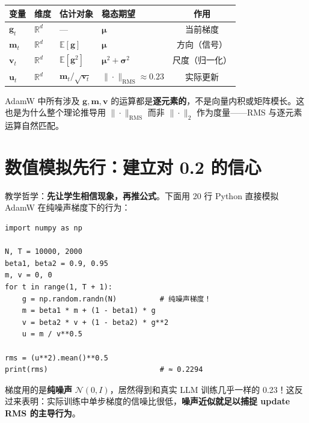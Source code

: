 \documentclass[11pt,a4paper]{ctexart}
\theoremstyle{definition}
\theoremstyle{remark}
\newcommand{\RMS}{\mathrm{RMS}}
\newcommand{\E}{\mathbb{E}}
\begin{document}
\begin{center}
\renewcommand{\arraystretch}{1.3}
\begin{tabular}{llllc}
\toprule
变量 & 维度 & 估计对象 & 稳态期望 & 作用 \\
\midrule
$\bm{g}_t$ & $\mathbb{R}^d$ & --- & $\bm{\mu}$ & 当前梯度 \\
$\bm{m}_t$ & $\mathbb{R}^d$ & $\E[\bm{g}]$ & $\bm{\mu}$ & 方向（信号） \\
$\bm{v}_t$ & $\mathbb{R}^d$ & $\E[\bm{g}^2]$ & $\bm{\mu}^2 + \bm{\sigma}^2$ & 尺度（归一化） \\
$\bm{u}_t$ & $\mathbb{R}^d$ & $\bm{m}_t / \sqrt{\bm{v}_t}$ & $\|\cdot\|_\RMS \approx 0.23$ & 实际更新 \\
\bottomrule
\end{tabular}
\end{center}
 
\begin{warning}
AdamW 中所有涉及 $\bm{g}, \bm{m}, \bm{v}$ 的运算都是\textbf{逐元素的}，不是向量内积或矩阵模长。这也是为什么整个理论推导用 $\|\cdot\|_\RMS$ 而非 $\|\cdot\|_2$ 作为度量——RMS 与逐元素运算自然匹配。
\end{warning}
 
\section{数值模拟先行：建立对 0.2 的信心}
 
教学哲学：\textbf{先让学生相信现象，再推公式}。下面用 20 行 Python 直接模拟 AdamW 在纯噪声梯度下的行为：
 
\begin{lstlisting}
import numpy as np
 
N, T = 10000, 2000
beta1, beta2 = 0.9, 0.95
m, v = 0, 0
for t in range(1, T + 1):
    g = np.random.randn(N)          # 纯噪声梯度！
    m = beta1 * m + (1 - beta1) * g
    v = beta2 * v + (1 - beta2) * g**2
    u = m / v**0.5
 
rms = (u**2).mean()**0.5
print(rms)                          # ≈ 0.2294
\end{lstlisting}
 
\begin{keyinsight}
梯度用的是\textbf{纯噪声} $\mathcal{N}(0, I)$，居然得到和真实 LLM 训练几乎一样的 0.23！这反过来表明：实际训练中单步梯度的信噪比很低，\textbf{噪声近似就足以捕捉 update RMS 的主导行为}。
\end{keyinsight}
 
\end{document}
